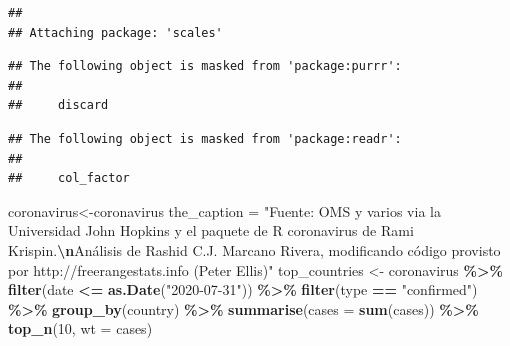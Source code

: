 \documentclass[
]{article}
\newenvironment{Shaded}{\begin{snugshade}}{\end{snugshade}}
\newcommand{\AttributeTok}[1]{\textcolor[rgb]{0.13,0.29,0.53}{#1}}
\newcommand{\DecValTok}[1]{\textcolor[rgb]{0.00,0.00,0.81}{#1}}
\newcommand{\FunctionTok}[1]{\textcolor[rgb]{0.13,0.29,0.53}{\textbf{#1}}}
\newcommand{\NormalTok}[1]{#1}
\newcommand{\OtherTok}[1]{\textcolor[rgb]{0.56,0.35,0.01}{#1}}
\newcommand{\SpecialCharTok}[1]{\textcolor[rgb]{0.81,0.36,0.00}{\textbf{#1}}}
\newcommand{\StringTok}[1]{\textcolor[rgb]{0.31,0.60,0.02}{#1}}
\begin{document}
\begin{verbatim}
## 
## Attaching package: 'scales'
\end{verbatim}

\begin{verbatim}
## The following object is masked from 'package:purrr':
## 
##     discard
\end{verbatim}

\begin{verbatim}
## The following object is masked from 'package:readr':
## 
##     col_factor
\end{verbatim}

\begin{Shaded}
\begin{Highlighting}[]
\NormalTok{coronavirus}\OtherTok{\textless{}{-}}\NormalTok{coronavirus}
\NormalTok{the\_caption }\OtherTok{=} \StringTok{"Fuente: OMS y varios via la Universidad John Hopkins y el paquete de R \textquotesingle{}coronavirus\textquotesingle{} de Rami Krispin.}\SpecialCharTok{\textbackslash{}n}\StringTok{Análisis de Rashid C.J. Marcano Rivera, modificando código provisto por http://freerangestats.info (Peter Ellis)"}
\NormalTok{top\_countries }\OtherTok{\textless{}{-}}\NormalTok{ coronavirus }\SpecialCharTok{\%\textgreater{}\%}
  \FunctionTok{filter}\NormalTok{(date }\SpecialCharTok{\textless{}=} \FunctionTok{as.Date}\NormalTok{(}\StringTok{"2020{-}07{-}31"}\NormalTok{)) }\SpecialCharTok{\%\textgreater{}\%}
  \FunctionTok{filter}\NormalTok{(type }\SpecialCharTok{==} \StringTok{"confirmed"}\NormalTok{) }\SpecialCharTok{\%\textgreater{}\%}
  \FunctionTok{group\_by}\NormalTok{(country) }\SpecialCharTok{\%\textgreater{}\%}
  \FunctionTok{summarise}\NormalTok{(}\AttributeTok{cases =} \FunctionTok{sum}\NormalTok{(cases)) }\SpecialCharTok{\%\textgreater{}\%}
  \FunctionTok{top\_n}\NormalTok{(}\DecValTok{10}\NormalTok{, }\AttributeTok{wt =}\NormalTok{ cases)}


\end{Highlighting}
\end{Shaded}
\end{document}
